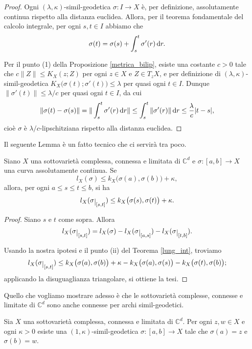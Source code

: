 \begin{proof}
    Ogni $(\lambda,\kappa)$-simil-geodetica $\sigma:I\longrightarrow X$ è, per definizione, assolutamente continua rispetto alla distanza euclidea. Allora, per il teorema fondamentale del calcolo integrale, per ogni $s,t\in I$ abbiamo che
    $$\sigma(t)=\sigma(s)+\int_s^t\sigma'(r)\mathop{}\!\mathrm{d} r.$$
    
    Per il punto (1) della Proposizione \ref{metrica_bilip}, esiste una costante $c>0$ tale che $c\|Z\| \le K_X(z;Z)$ per ogni $z\in X$ e $Z\in T_zX$, e per definizione di $(\lambda,\kappa)$-simil-geodetica $K_X\big(\sigma(t);\sigma'(t)\big) \le \lambda$ per quasi ogni $t\in I$. Dunque $\|\sigma'(t)\| \le \lambda/c$ per quasi ogni $t\in I$, da cui
    $$\|\sigma(t)-\sigma(s)\| =\|\int_s^t\sigma'(r)\mathop{}\!\mathrm{d} r\| \le \int_s^t\|\sigma'(r)\|\mathop{}\!\mathrm{d} r \le \frac{\lambda}{c}|t-s|,$$
    cioè $\sigma$ è $\lambda/c$-lipschitziana rispetto alla distanza euclidea.
\end{proof}

Il seguente Lemma è un fatto tecnico che ci servirà tra poco.

\begin{lm} \label{restrdis}
    Siano $X$ una sottovarietà complessa, connessa e limitata di $\mathbb{C}^d$ e $\sigma:[a,b] \longrightarrow X$ una curva assolutamente continua. Se
    $$l_X(\sigma) \le k_X\big(\sigma(a),\sigma(b)\big)+\kappa,$$
    allora, per ogni $a \le s \le t \le b$, si ha
    $$l_X(\sigma\restrict{[s,t]}) \le k_X\big(\sigma(s),\sigma(t)\big)+\kappa.$$
\end{lm}

\begin{proof}
    Siano $s$ e $t$ come sopra. Allora
    $$l_X(\sigma\restrict{[s,t]})=l_X(\sigma)-l_X(\sigma\restrict{[a,s]})-l_X(\sigma\restrict{[t,b]}).$$

    Usando la nostra ipotesi e il punto (ii) del Teorema \ref{lung_int}, troviamo
    $$l_X(\sigma\restrict{[s,t]}) \le k_X\big(\sigma(a),\sigma(b)\big)+\kappa-k_X\big(\sigma(a),\sigma(s)\big)-k_X\big(\sigma(t),\sigma(b)\big);$$
    applicando la disuguaglianza triangolare, si ottiene la tesi.
\end{proof}

Quello che vogliamo mostrare adesso è che le sottovarietà complesse, connesse e limitate di $\mathbb{C}^d$ sono anche connesse per archi simil-geodetici.

\begin{thm} \label{similgeo_conn}
    Sia $X$ una sottovarietà complessa, connessa e limitata di $\mathbb{C}^d$. Per ogni $z,w \in X$ e ogni $\kappa>0$ esiste una $(1,\kappa)$-simil-geodetica $\sigma:[a,b]\longrightarrow X$ tale che $\sigma(a)=z$ e $\sigma(b)=w$.
\end{thm}

